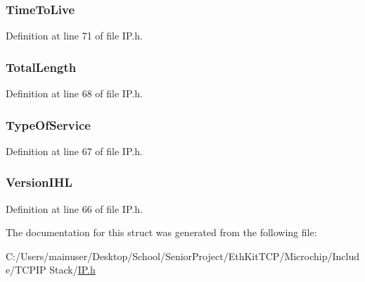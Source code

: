 \subsubsection[{Time\+To\+Live}]{ Time\+To\+Live}\label{struct___i_p___h_e_a_d_e_r_a60bdd9d9c701296edda45f0519aa4afb}


Definition at line 71 of file I\+P.\+h.

\hypertarget{struct___i_p___h_e_a_d_e_r_a0869535fb048abe001be1e8b139976f6}{}
\subsubsection[{Total\+Length}]{ Total\+Length}\label{struct___i_p___h_e_a_d_e_r_a0869535fb048abe001be1e8b139976f6}


Definition at line 68 of file I\+P.\+h.

\hypertarget{struct___i_p___h_e_a_d_e_r_a9106cd83a2edc9722948cc0adf39778e}{}
\subsubsection[{Type\+Of\+Service}]{ Type\+Of\+Service}\label{struct___i_p___h_e_a_d_e_r_a9106cd83a2edc9722948cc0adf39778e}


Definition at line 67 of file I\+P.\+h.

\hypertarget{struct___i_p___h_e_a_d_e_r_a87dcae13270bf37a7286d034ae486e01}{}
\subsubsection[{Version\+I\+H\+L}]{ Version\+I\+H\+L}\label{struct___i_p___h_e_a_d_e_r_a87dcae13270bf37a7286d034ae486e01}


Definition at line 66 of file I\+P.\+h.



The documentation for this struct was generated from the following file\+:\begin{DoxyCompactItemize}
\item 
C\+:/\+Users/mainuser/\+Desktop/\+School/\+Senior\+Project/\+Eth\+Kit\+T\+C\+P/\+Microchip/\+Include/\+T\+C\+P\+I\+P Stack/\hyperlink{_i_p_8h}{I\+P.\+h}\end{DoxyCompactItemize}
